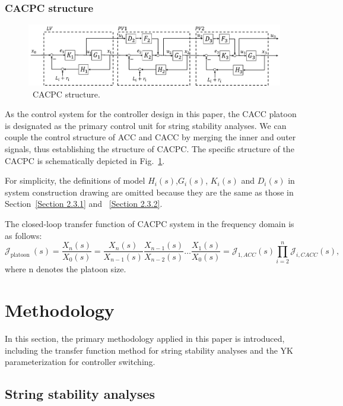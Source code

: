 \documentclass[a4paper,fleqn]{cas-sc}
\begin{document}
\subsubsection{CACPC structure}
\label{Section 2.3.3}

\begin{figure}
  \centering
  \includegraphics[width=14cm]{figs/fig3.png}
  \caption{~CACPC structure.}
  \label{fig3}
\end{figure}

As the control system for the controller design in this paper, the CACC platoon is designated as the primary control unit for string stability analyses. We can couple the control structure of ACC and CACC by merging the inner and outer signals, thus establishing the structure of CACPC. The specific structure of the CACPC is schematically depicted in Fig.~\ref{fig3}.

For simplicity, the definitions of model $H_i(s)$,$G_i(s)$, $K_i(s)$ and $D_i(s)$ in system construction drawing are omitted because they are the same as those in Section~\ref{Section 2.3.1} and ~\ref{Section 2.3.2}.

The closed-loop transfer function of CACPC system in the frequency domain is as follows:
\begin{equation}
  \mathcal{J}_{\text {platoon }}(s)=\frac{X_{n}(s)}{X_{0}(s)}=\frac{X_{n}(s)}{X_{n-1}(s)} \frac{X_{n-1}(s)}{X_{n-2}(s)} \ldots \frac{X_{1}(s)}{X_{0}(s)}=\mathcal{J}_{1, A C C}(s) \prod_{i=2}^{n} \mathcal{J}_{i, C A C C}(s),
  \label{Eq8}
\end{equation}
where n denotes the platoon size.

\section{Methodology}
\label{Section 3}
In this section, the primary methodology applied in this paper is introduced, including the transfer function method for string stability analyses and the YK parameterization for controller switching.

\subsection{String stability analyses}
\label{Section 3.1}
\end{document}
